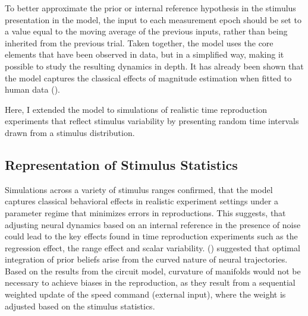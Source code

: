 \documentclass[10pt]{article}
\begin{document}
To better approximate the prior or internal reference hypothesis in the stimulus presentation in the model, the input to each measurement epoch should be set to a value equal to the moving average of the previous inputs, rather than being inherited from the previous trial.  
Taken together, the model uses the core elements that have been observed in data, but in a simplified way, making it possible to study the resulting dynamics in depth. 
It has already been shown that the model captures the classical effects of magnitude estimation when fitted to human data (\cite{Egger2020}).

Here, I extended the model to simulations of realistic time reproduction experiments that reflect stimulus variability by presenting random time intervals drawn from a stimulus distribution.

\subsection{Representation of Stimulus Statistics}
Simulations across a variety of stimulus ranges confirmed, that the model captures classical behavioral effects in realistic experiment settings under a parameter regime that minimizes errors in reproductions. %
This suggests, that adjusting neural dynamics based on an internal reference in the presence of noise could lead to the key effects found in time reproduction experiments such as the regression effect, the range effect and scalar variability. 
\citeauthor{Sohn2019} (\citeyear{Sohn2019}) suggested that optimal integration of prior beliefs arise from the curved nature of neural trajectories. Based on the results from the circuit model, curvature of manifolds would not be necessary to achieve biases in the reproduction, as they result from a sequential weighted update of the speed command (external input), where the weight is adjusted based on the stimulus statistics. 
\end{document}
